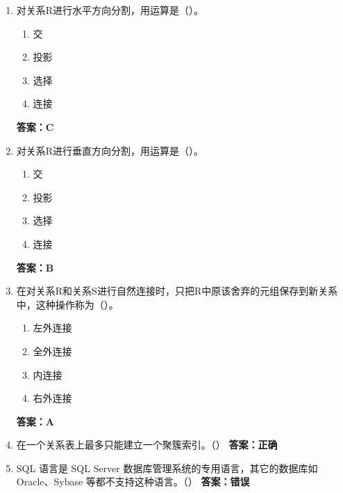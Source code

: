 \documentclass[12pt, a4paper]{article}
\begin{document}
\begin{enumerate}[label=\arabic*.]
	\item 对关系R进行水平方向分割，用运算是（\quad）。
	      \begin{enumerate}
		      \item 交
		      \item 投影
		      \item 选择
		      \item 连接
	      \end{enumerate}
	      \textbf{答案：C}

	\item 对关系R进行垂直方向分割，用运算是（\quad）。
	      \begin{enumerate}
		      \item 交
		      \item 投影
		      \item 选择
		      \item 连接
	      \end{enumerate}
	      \textbf{答案：B}

	\item 在对关系R和关系S进行自然连接时，只把R中原该舍弃的元组保存到新关系中，这种操作称为（\quad）。
	      \begin{enumerate}
		      \item 左外连接
		      \item 全外连接
		      \item 内连接
		      \item 右外连接
	      \end{enumerate}
	      \textbf{答案：A}

	\item 在一个关系表上最多只能建立一个聚簇索引。（\quad）
	      \textbf{答案：正确}

	\item SQL 语言是 SQL Server 数据库管理系统的专用语言，其它的数据库如 Oracle、Sybase 等都不支持这种语言。（\quad）
	      \textbf{答案：错误}
\end{enumerate}
\end{document}

